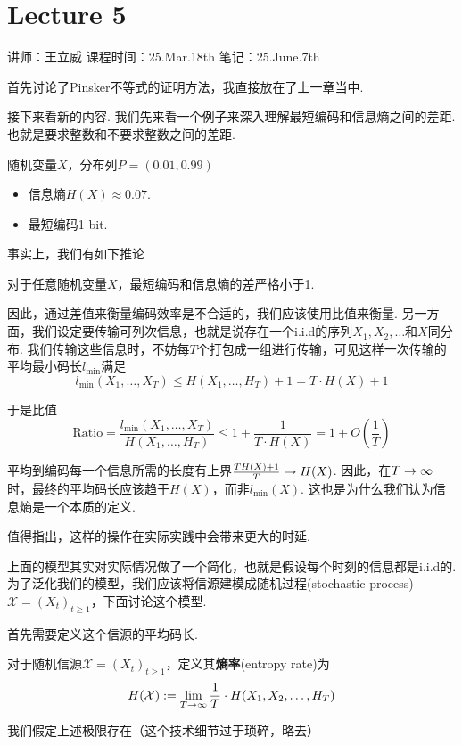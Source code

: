 \chapter{Lecture 5}

\begin{center}
    讲师：王立威 \qquad
    课程时间：25.Mar.18th \qquad 
    笔记：25.June.7th
\end{center}

\bigskip

首先讨论了Pinsker不等式的证明方法，我直接放在了上一章当中. 

接下来看新的内容.  我们先来看一个例子来深入理解最短编码和信息熵之间的差距. 也就是要求整数和不要求整数之间的差距.  
\begin{example}
随机变量$X$，分布列$P=(0.01, 0.99)$ 
\begin{itemize}
    \item 信息熵$H(X) \approx 0.07 $.
    \item 最短编码1 bit.
\end{itemize}
\end{example}

事实上，我们有如下推论 
\begin{corollary}
    对于任意随机变量$X$，最短编码和信息熵的差严格小于1.
\end{corollary}

因此，通过差值来衡量编码效率是不合适的，我们应该使用比值来衡量.  另一方面，我们设定要传输可列次信息，也就是说存在一个i.i.d的序列$X_1, X_2,\dots$和$X$同分布.  我们传输这些信息时，不妨每$T$个打包成一组进行传输，可见这样一次传输的平均最小码长$l_{\min}$满足 
\[
l_{\min}(X_1, \dots, X_T) \le H(X_1, \dots, H_T) + 1 = T\cdot H(X) + 1
\] 

于是比值 
\[
\text{Ratio} = \dfrac{l_{\min}(X_1, \dots, X_T)}{H(X_1, \dots, H_T)} \le 1 + \dfrac{1}{T \cdot H(X)} = 1 + O\left(\dfrac{1}{T} \right)
\]

平均到编码每一个信息所需的长度有上界$\frac{T H(X) + 1}{T} \rightarrow H(X)$.  因此，在$T \rightarrow \infty$时，最终的平均码长应该趋于$H(X)$，而非$l_{\min}(X)$.  这也是为什么我们认为信息熵是一个本质的定义.  

值得指出，这样的操作在实际实践中会带来更大的时延. 

上面的模型其实对实际情况做了一个简化，也就是假设每个时刻的信息都是i.i.d的. 为了泛化我们的模型，我们应该将信源建模成随机过程(stochastic process)$\mathcal{X} = (X_t)_{t\ge 1}$，下面讨论这个模型.  

首先需要定义这个信源的平均码长. 
\begin{definition}[熵率]
    对于随机信源$\mathcal{X} = (X_t)_{t\ge 1}$，定义其\textbf{熵率}(entropy rate)为 
    \[
    H(\mathcal{X}):= \lim_{T \rightarrow \infty} \dfrac 1T \cdot H(X_1, X_2, \dots, H_T)
    \]

    我们假定上述极限存在（这个技术细节过于琐碎，略去）
\end{definition}

